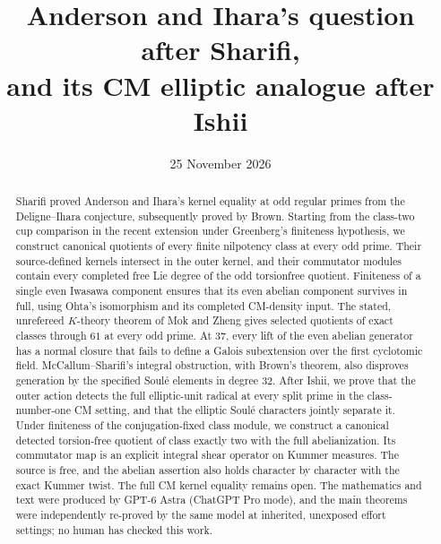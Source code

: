 \documentclass[11pt]{article}
\title{Anderson and Ihara's question after Sharifi,\\and its CM elliptic analogue after Ishii}
\author{}
\date{25 November 2026}
\theoremstyle{definition}\newtheorem{definition}[theorem]{Definition}
\begin{document}
\maketitle
\begin{abstract}
Sharifi proved Anderson and Ihara's kernel equality at odd regular primes from the Deligne--Ihara conjecture, subsequently proved by Brown. Starting from the class-two cup comparison in the recent extension under Greenberg's finiteness hypothesis, we construct canonical quotients of every finite nilpotency class at every odd prime. Their source-defined kernels intersect in the outer kernel, and their commutator modules contain every completed free Lie degree of the odd torsionfree quotient. Finiteness of a single even Iwasawa component ensures that its even abelian component survives in full, using Ohta's isomorphism and its completed CM-density input. The stated, unrefereed $K$-theory theorem of Mok and Zheng gives selected quotients of exact classes through $61$ at every odd prime. At $37$, every lift of the even abelian generator has a normal closure that fails to define a Galois subextension over the first cyclotomic field. McCallum--Sharifi's integral obstruction, with Brown's theorem, also disproves generation by the specified Soul\'e elements in degree $32$. After Ishii, we prove that the outer action detects the full elliptic-unit radical at every split prime in the class-number-one CM setting, and that the elliptic Soul\'e characters jointly separate it. Under finiteness of the conjugation-fixed class module, we construct a canonical detected torsion-free quotient of class exactly two with the full abelianization. Its commutator map is an explicit integral shear operator on Kummer measures. The source is free, and the abelian assertion also holds character by character with the exact Kummer twist. The full CM kernel equality remains open. The mathematics and text were produced by GPT-6 Astra (ChatGPT Pro mode), and the main theorems were independently re-proved by the same model at inherited, unexposed effort settings; no human has checked this work.
\end{abstract}
\end{document}
